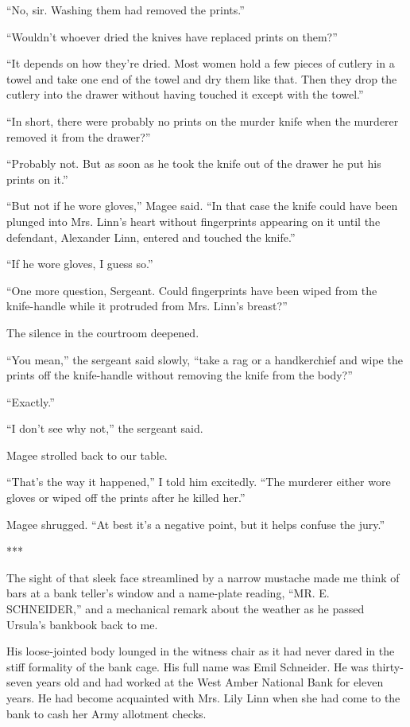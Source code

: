 \documentclass{novel}
\begin{document}
“No, sir. Washing them had removed the prints.”

“Wouldn’t whoever dried the knives have replaced prints on them?”

“It depends on how they’re dried. Most women hold a few pieces of cutlery in a towel and take one end of the towel and dry them like that. Then they drop the cutlery into the drawer without having touched it except with the towel.”

“In short, there were probably no prints on the murder knife when the murderer removed it from the drawer?”

“Probably not. But as soon as he took the knife out of the drawer he put his prints on it.”

“But not if he wore gloves,” Magee said. “In that case the knife could have been plunged into Mrs. Linn’s heart without fingerprints appearing on it until the defendant, Alexander Linn, entered and touched the knife.”

“If he wore gloves, I guess so.”

“One more question, Sergeant. Could fingerprints have been wiped from the knife-handle while it protruded from Mrs. Linn’s breast?”

The silence in the courtroom deepened.

“You mean,” the sergeant said slowly, “take a rag or a handkerchief and wipe the prints off the knife-handle without removing the knife from the body?”

“Exactly.”

“I don’t see why not,” the sergeant said.

Magee strolled back to our table.

“That’s the way it happened,” I told him excitedly. “The murderer either wore gloves or wiped off the prints after he killed her.”

Magee shrugged. “At best it’s a negative point, but it helps confuse the jury.”

***

The sight of that sleek face streamlined by a narrow mustache made me think of bars at a bank teller’s window and a name-plate reading, “MR. E. SCHNEIDER,” and a mechanical remark about the weather as he passed Ursula’s bankbook back to me.

His loose-jointed body lounged in the witness chair as it had never dared in the stiff formality of the bank cage. His full name was Emil Schneider. He was thirty-seven years old and had worked at the West Amber National Bank for eleven years. He had become acquainted with Mrs. Lily Linn when she had come to the bank to cash her Army allotment checks.
\end{document}
